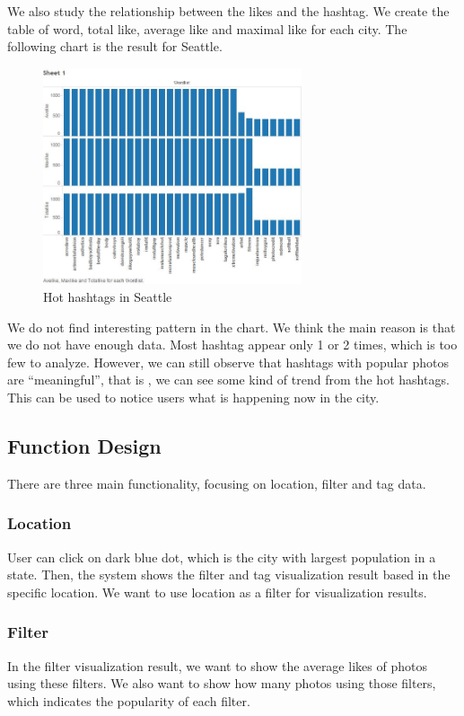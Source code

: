 \documentclass[conference]{acmsiggraph}
\begin{document}
We also study the relationship between the likes and the hashtag. We create the table of word, total like, average like and maximal like for each city. The following chart is the result for Seattle.
\begin{figure}[ht]
  \centering
  \includegraphics[width=3in]{images/sample_Seattle_like_word}
  \caption{Hot hashtags in Seattle}
\end{figure}
We do not find interesting pattern in the chart. We think the main reason is that we do not have enough data. Most hashtag appear only 1 or 2 times, which is too few to analyze. However, we can still observe that hashtags with popular photos are “meaningful”, that is , we can see some kind of trend from the hot hashtags. This can be used to notice users what is happening now in the city.

\subsection{Function Design}
There are three main functionality, focusing on location, filter and tag data.

\subsubsection{Location}
User can click on dark blue dot, which is the city with largest population in a state. Then, the system shows the filter and tag visualization result based in the specific location. We want to use location as a filter for visualization results.

\subsubsection{Filter}
In the filter visualization result, we want to show the average likes of photos using these filters. We also want to show how many photos using those filters, which indicates the popularity of each filter.
\end{document}
